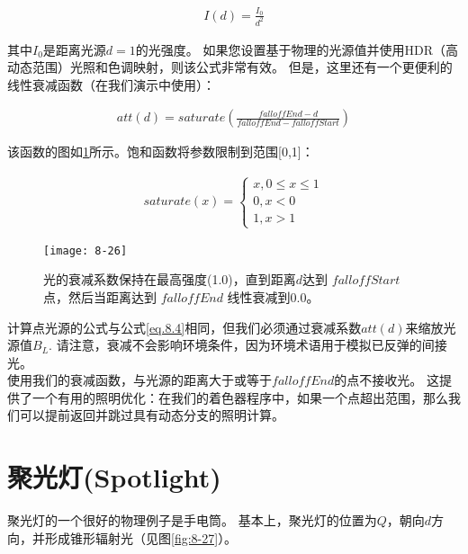 \begin{align*}
I(d)=\frac{I_{0}}{d^{2}}
\end{align*}

\begin{flushleft}
其中$I_{0}$是距离光源$d=1$的光强度。 如果您设置基于物理的光源值并使用HDR（高动态范围）光照和色调映射，则该公式非常有效。 但是，这里还有一个更便利的线性衰减函数（在我们演示中使用）：\\
\end{flushleft}

\begin{align*}
att(d)=saturate(\frac{falloffEnd-d}{falloffEnd-falloffStart})
\end{align*}

\begin{flushleft}
该函数的图如\ref{fig:8-26}所示。饱和函数将参数限制到范围[0,1]：\\
\end{flushleft}

\begin{align*}
saturate(x)=\left\{\begin{matrix}
x,0\leq x\leq 1 \\
0,x < 0\\
1,x > 1
\end{matrix}\right.
\end{align*}

\begin{figure}[h]
    \label{fig:8-26}
    \texttt{[image: 8-26]}
    \centering
    \caption{光的衰减系数保持在最高强度(1.0)，直到距离$d$达到 $falloffStart$ 点，然后当距离达到 $falloffEnd$ 线性衰减到0.0。}
\end{figure}

\begin{flushleft}
计算点光源的公式与公式\ref{eq.8.4}相同，但我们必须通过衰减系数$att(d)$来缩放光源值$B_{L}$. 请注意，衰减不会影响环境条件，因为环境术语用于模拟已反弹的间接光。\\
使用我们的衰减函数，与光源的距离大于或等于$falloffEnd$的点不接收光。 这提供了一个有用的照明优化：在我们的着色器程序中，如果一个点超出范围，那么我们可以提前返回并跳过具有动态分支的照明计算。
\end{flushleft}

\section{聚光灯(Spotlight)}
\begin{flushleft}
聚光灯的一个很好的物理例子是手电筒。 基本上，聚光灯的位置为$Q$，朝向$d$方向，并形成锥形辐射光（见图\ref{fig:8-27}）。
\end{flushleft}

